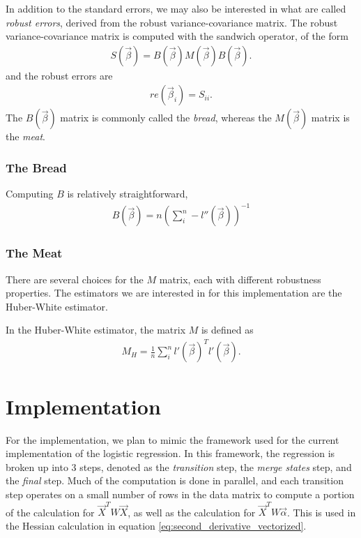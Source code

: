 \documentclass[12pt]{article}
\begin{document}
In addition to the standard errors, we may also be interested in what are called \textit{robust errors}, derived from the robust variance-covariance matrix.  The robust variance-covariance matrix is computed with the sandwich operator\cite{robust_var}, of the form
\begin{align}
S( \vec{\beta}) = B(\vec{\beta}) M( \vec{\beta}) B( \vec{\beta}).  
\end{align}
and the robust errors are
\begin{align}
re(\vec{\beta}_i) = S_{ii}. 
\end{align}
The $B( \vec{\beta})$ matrix is commonly called the \textit{bread}, whereas the $M( \vec{\beta})$ matrix is the \textit{meat}.  

\subsubsection{The Bread}
Computing $B$ is relatively straightforward, 
\begin{align}
B(\vec{\beta}) = n\left(\sum_i^n -l''( \vec{\beta}) \right)^{-1}
\end{align}

\subsubsection{The Meat}
There are several choices for the $M$ matrix, each with different robustness properties.  The estimators we are interested in for this implementation are the Huber-White estimator.  

In the Huber-White estimator, the matrix $M$ is defined as
\begin{align}
M_{H} =\frac{1}{n} \sum_i^n l'( \vec{\beta})^T l'( \vec{\beta}) .
\end{align}


\section{Implementation}\label{sec:implem}

For the implementation, we plan to mimic the framework used for the current implementation of the logistic regression.  In this framework, the regression is broken up into 3 steps, denoted as the  \textit{transition} step, the \textit{merge states} step, and the \textit{final} step.  Much of the computation is done in parallel, and each transition step operates on a small number of rows in the data matrix to compute a portion of the calculation for $\vec{X}^T W\vec{X}$, as well as the calculation for $\vec{X}^TW\vec{\alpha}$. This is used in the Hessian calculation in equation \ref{eq:second_derivative_vectorized}.  
\end{document}
